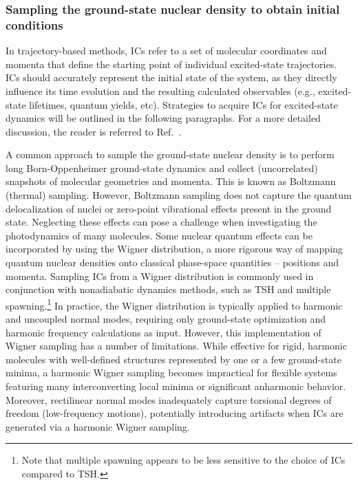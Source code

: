 \documentclass[9pt,bestpractices]{livecoms}
\begin{document}
\subsubsection{Sampling the ground-state nuclear density to obtain initial conditions}
\label{sec:gssampling}

In trajectory-based methods, ICs refer to a set of molecular coordinates and momenta that define the starting point of individual excited-state trajectories. ICs should accurately represent the initial state of the system, as they directly influence its time evolution and the resulting calculated observables (e.g., excited-state lifetimes, quantum yields, etc). Strategies to acquire ICs for excited-state dynamics will be outlined in the following paragraphs. For a more detailed discussion, the reader is referred to Ref.~. 

A common approach to sample the ground-state nuclear density is to perform long Born-Oppenheimer ground-state dynamics and collect (uncorrelated) snapshots of molecular geometries and momenta. This is known as Boltzmann (thermal) sampling. However, Boltzmann sampling does not capture the quantum delocalization of nuclei or zero-point vibrational effects present in the ground state.\cite{barbatti2016effects} Neglecting these effects can pose a challenge when investigating the photodynamics of many molecules. Some nuclear quantum effects can be incorporated by using the Wigner distribution,\cite{tannor_book,barbatti2016effects} a more rigorous way of mapping quantum nuclear densities onto classical phase-space quantities -- positions and momenta. Sampling ICs from a Wigner distribution is commonly used in conjunction with nonadiabatic dynamics methods, such as TSH and multiple spawning.\footnote{Note that multiple spawning appears to be less sensitive to the choice of ICs compared to TSH.\cite{ben2007continuous}} In practice, the Wigner distribution is typically applied to harmonic and uncoupled normal modes, requiring only ground-state optimization and harmonic frequency calculations as input. However, this implementation of Wigner sampling has a number of limitations.\cite{persico2014overview,mccoy2014role,suchan2018importance,mai2018novel,prlj2023deciphering} While effective for rigid, harmonic molecules with well-defined structures represented by one or a few ground-state minima, a harmonic Wigner sampling becomes impractical for flexible systems featuring many interconverting local minima or significant anharmonic behavior. Moreover, rectilinear normal modes inadequately capture torsional degrees of freedom (low-frequency motions), potentially introducing artifacts when ICs are generated via a harmonic Wigner sampling.\cite{mccoy2014role,mai2018novel,persico2014overview,prlj2023deciphering} 
\end{document}
